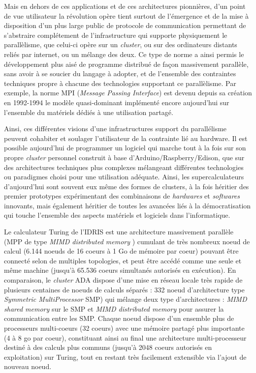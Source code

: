 Mais en dehors de ces applications et de ces architectures pionnières, d’un point de vue utilisateur la révolution opère tient surtout de l’émergence et de la mise à disposition d’un plus large public de protocole de communication permettant de s’abstraire complétement de l’infrastructure qui supporte physiquement le parallèlisme, que celui-ci opère sur un \textit{cluster}, ou sur des ordinateurs distants reliés par internet, ou un mélange des deux. Ce type de norme a ainsi permis le développement plus aisé de programme distribué de façon massivement parallèle, sans avoir à se soucier du langage à adopter, et de l’ensemble des contraintes techniques propre à chacune des technologies supportant ce parallèlisme. Par exemple, la norme MPI (\textit{Message Passing Interface}) est devenu depuis sa création en 1992-1994 le modèle quasi-dominant implémenté encore aujourd’hui sur l’ensemble du matériels dédiés à une utilisation partagé.

Ainsi, ces différentes visions d'une infrastructures support du parallélisme peuvent cohabiter et soulager l'utilisateur de la contrainte lié au hardware. Il est possible aujourd'hui de programmer un logiciel qui marche tout à la fois sur son propre \textit{cluster} personnel construit à base d'Arduino/Raspberry/Edison, que sur des architectures techniques plus complexes mélangeant différentes technologies ou paradigmes choisi pour une utilisation adéquate. Ainsi, les supercalculateurs d'aujourd'hui sont souvent eux même des formes de clusters, à la fois héritier des premier prototypes expérimentant des combinaisons de \textit{hardwares} et \textit{softwares} innovants, mais également héritier de toutes les avancées liés à la démocratisation qui touche l'ensemble des aspects matériels et logiciels dans l'informatique.

Le calculateur Turing de l'IDRIS  est une architecture massivement parallèle (MPP de type \textit{MIMD distributed memory} \autocite{Snir2011}) cumulant de très nombreux noeud de calcul (6.144 noeuds de 16 coeurs à 1 Go de mémoire par coeur) pouvant être connecté selon de multiples topologies, et peut être accédé comme une seule et même machine (jusqu'à 65.536 coeurs simultanés autorisés en exécution). En comparaison, le \textit{cluster} ADA dispose d'une mise en réseau locale très rapide de plusieurs centaines de noeuds de calculs séparés : 332 noeud d'architecture type \textit{Symmetric MultiProcessor} SMP) qui mélange deux type d'architectures : \textit{MIMD shared memory} sur le SMP et \textit{MIMD distributed memory} pour assurer la communication entre les SMP. Chaque noeud dispose d'un ensemble plus de processeurs multi-coeurs (32 coeurs) avec une mémoire partagé plus importante (4 à 8 go par coeur), constituant ainsi au final une architecture multi-processeur destiné à des calculs plus communs (jusqu'à 2048 coeurs autorisés en exploitation) sur Turing, tout en restant très facilement extensible via l'ajout de nouveau noeud.

